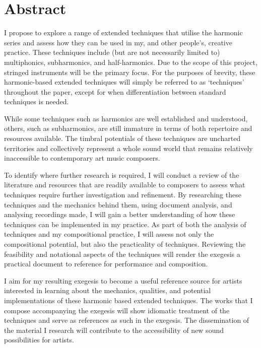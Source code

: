 \chapter*{Abstract}

I propose to explore a range of extended techniques that utilise the harmonic series and assess how they can be used in my, and other people's, creative practice. 
These techniques include (but are not necessarily limited to) multiphonics, subharmonics, and half-harmonics. 
Due to the scope of this project, stringed instruments will be the primary focus. 
For the purposes of brevity, these harmonic-based extended techniques will simply be referred to as `techniques' throughout the paper, except for when differentiation between standard techniques is needed. 

While some techniques such as harmonics are well established and understood, others, such as subharmonics, are still immature in terms of both repertoire and resources available. 
The timbral potentials of these techniques are uncharted territories and collectively represent a whole sound world that remains relatively inaccessible to contemporary art music composers.

To identify where further research is required, I will conduct a review of the literature and resources that are readily available to composers to assess what techniques require further investigation and refinement.
By researching these techniques and the mechanics behind them, using document analysis, and analysing recordings made, I will gain a better understanding of how these techniques can be implemented in my practice. 
As part of both the analysis of techniques and my compositional practice, I will assess not only the compositional potential, but also the practicality of techniques. 
Reviewing the feasibility and notational aspects of the techniques will render the exegesis a practical document to reference for performance and composition.

I aim for my resulting exegesis to become a useful reference source for artists interested in learning about the mechanics, qualities, and potential implementations of these harmonic based extended techniques.
The works that I compose accompanying the exegesis will show idiomatic treatment of the techniques and serve as references as such in the exegesis.
The dissemination of the material I research will contribute to the accessibility of new sound possibilities for artists.